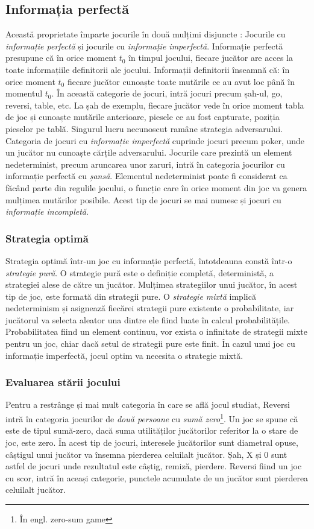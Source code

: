 \documentclass[12pt,twoside,a4paper,fleqn]{book}
\theoremstyle{definition}
\begin{document}
\subsection{Informația perfectă}
Această proprietate împarte jocurile în două mulțimi disjuncte \cite{allis}: Jocurile cu \emph{informație perfectă} și jocurile cu  \emph{informație imperfectă}. Informație perfectă presupune că în orice moment $t_{0}$ în timpul jocului, fiecare jucător are acces la toate informațiile definitorii ale jocului. Informații definitorii înseamnă că: în orice moment $t_{0}$ fiecare jucător cunoaște toate mutările ce au avut loc până în momentul $t_{0}$. În această categorie de jocuri, intră jocuri precum șah-ul, go, reversi, table, etc. La șah de exemplu, fiecare jucător vede în orice moment tabla de joc și cunoaște mutările anterioare, piesele ce au fost capturate, poziția pieselor pe tablă. Singurul lucru necunoscut ramâne strategia adversarului. Categoria de jocuri cu \emph{informație imperfectă} cuprinde jocuri precum poker, unde un jucător nu cunoaște cărțile adversarului. Jocurile care prezintă un element nedeterminist, precum aruncarea unor zaruri, intră în categoria jocurilor cu informație perfectă cu \emph{șansă}. Elementul nedeterminist poate fi considerat ca făcând parte din regulile jocului, o funcție care în orice moment din joc va genera mulțimea mutărilor posibile. Acest tip de jocuri se mai numesc și jocuri cu \emph{informație incompletă}.
\subsubsection{Strategia optimă}Strategia optimă într-un joc cu informație perfectă, întotdeauna constă într-o \emph{strategie pură}\cite{allis}. O strategie pură este o definiție completă, deterministă, a strategiei alese de către un jucător. Mulțimea strategiilor unui jucător, în acest tip de joc, este formată din strategii pure. O \emph{strategie mixtă} implică nedeterminism și asignează fiecărei strategii pure existente o probabilitate, iar jucătorul va selecta aleator una dintre ele fiind luate în calcul probabilitățile. Probabilitatea fiind un element continuu, vor exista o infinitate de strategii mixte pentru un joc, chiar dacă setul de strategii pure este finit. În cazul unui joc cu informație imperfectă, jocul optim va necesita o strategie mixtă.
\subsubsection{Evaluarea stării jocului}
Pentru a restrânge și mai mult categoria în care se află jocul studiat, Reversi intră în categoria jocurilor de \emph{două persoane} cu \emph{sumă zero}\footnote{În engl. zero-sum game}. Un joc se spune că este de tipul sumă-zero, dacă suma utilităților jucătorilor referitor la o stare de joc, este zero. În acest tip de jocuri, interesele jucătorilor sunt diametral opuse, câștigul unui jucător va însemna pierderea celuilalt jucător. Șah, X și 0 sunt astfel de jocuri unde rezultatul este câștig, remiză, pierdere. Reversi fiind un joc cu scor, intră în aceași categorie, punctele acumulate de un jucător sunt pierderea celuilalt jucător.
\end{document}
